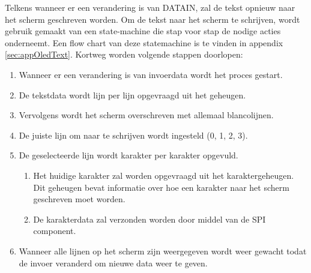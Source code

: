  		\par Telkens wanneer er een verandering is van DATA\textunderscore IN, zal de tekst opnieuw naar het scherm geschreven worden. Om de tekst naar het scherm te schrijven, wordt gebruik gemaakt van een state-machine die stap voor stap de nodige acties onderneemt. Een flow chart van deze statemachine is te vinden in appendix \ref{sec:appOledText}. Kortweg worden volgende stappen doorlopen:

 			\begin{enumerate}
 				\item Wanneer er een verandering is van invoerdata wordt het proces gestart.
 				\item De tekstdata wordt lijn per lijn opgevraagd uit het geheugen.
 				\item Vervolgens wordt het scherm overschreven met allemaal blancolijnen.
 				\item De juiste lijn om naar te schrijven wordt ingesteld (0, 1, 2, 3).
 				\item De geselecteerde lijn wordt karakter per karakter opgevuld.
 						\begin{enumerate}
 							\item Het huidige karakter zal worden opgevraagd uit het karaktergeheugen. Dit geheugen bevat informatie over hoe een karakter naar het scherm geschreven moet worden.
 							\item De karakterdata zal verzonden worden door middel van de SPI component.
 						\end{enumerate}
 				\item Wanneer alle lijnen op het scherm zijn weergegeven wordt weer gewacht todat de invoer veranderd om nieuwe data weer te geven.
 			\end{enumerate}


